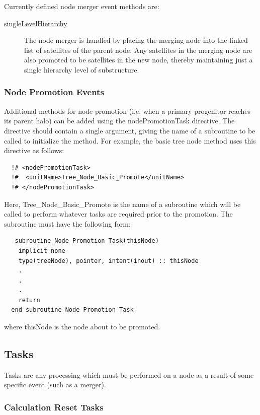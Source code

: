 Currently defined node merger event methods are:
\begin{description}
 \item [\hyperlink{events.node_merger.single_level_hierarchy.F90:events_node_mergers_slh:events_node_merger_do_slh}{{\normalfont \ttfamily singleLevelHierarchy}}] The node merger is handled by placing the merging node into the linked list of satellites of the parent node. Any satellites in the merging node are also promoted to be satellites in the new node, thereby maintaining just a single hierarchy level of substructure.
\end{description}

\subsubsection{Node Promotion Events}

Additional methods for node promotion (i.e. when a primary progenitor reaches its parent halo) can be added using the {\normalfont \ttfamily nodePromotionTask} directive. The directive should contain a single argument, giving the name of a subroutine to be called to initialize the method. For example, the {\normalfont \ttfamily basic} tree node method uses this directive as follows:
\begin{verbatim}
  !# <nodePromotionTask>
  !#  <unitName>Tree_Node_Basic_Promote</unitName>
  !# </nodePromotionTask>
\end{verbatim}
Here, {\normalfont \ttfamily Tree\_Node\_Basic\_Promote} is the name of a subroutine which will be called to perform whatever tasks are required prior to the promotion. The subroutine must have the following form:
\begin{verbatim}
   subroutine Node_Promotion_Task(thisNode)
    implicit none
    type(treeNode), pointer, intent(inout) :: thisNode
    .
    .
    .
    return
  end subroutine Node_Promotion_Task
\end{verbatim}
where {\normalfont \ttfamily thisNode} is the node about to be promoted.

\subsection{Tasks}

Tasks are any processing which must be performed on a node as a result of some specific event (such as a merger).

\subsubsection{Calculation Reset Tasks}\label{sec:CalculationResetTask}

